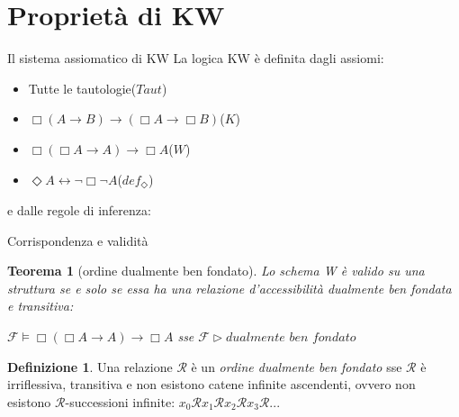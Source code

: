 \documentclass{beamer}
\begin{document}
\section{Proprietà di KW}
\begin{frame}{Il sistema assiomatico di KW}
La logica KW è definita dagli assiomi:
\begin{exampleblock}{}
    \begin{itemize}
        \item Tutte le tautologie\qquad\qquad\qquad\qquad\qquad\qquad ($Taut$)
        \item $\Box(A \to B) \to (\Box A \to \Box B)$\qquad\qquad\qquad\qquad\quad ($K$)
        \item $\Box (\Box A \to A) \to \Box A$\qquad\qquad\qquad\qquad\qquad\qquad ($W$)
        \item $\Diamond A \leftrightarrow \neg\Box\neg A$\qquad\qquad\qquad\qquad\qquad\qquad\qquad ($def_\Diamond$)
    \end{itemize}
\end{exampleblock}

e dalle regole di inferenza:
\begin{exampleblock}{}
        \begin{prooftree}
    \end{prooftree}
    \begin{prooftree}
    \end{prooftree}
\end{exampleblock}

\end{frame}




\begin{frame}{Corrispondenza e validità}
\newtheorem{teorema}{Teorema}
\begin{teorema}[ordine dualmente ben fondato]
Lo schema W è valido su una struttura se e solo se essa ha una relazione d’accessibilità dualmente ben fondata e transitiva:
\begin{center}
    $\mathcal{F} \models \Box(\Box A \to A) \to \Box A$ \textit{sse} $\mathcal{F}\rhd \textit{dualmente ben fondato}$
\end{center}

\end{teorema}
\theoremstyle{definition}
\newtheorem{defn}{Definizione}
\begin{defn}
Una relazione $\mathcal{R}$ è un \textit{ordine dualmente ben fondato} sse $\mathcal{R}$ è irriflessiva, transitiva e non esistono catene infinite ascendenti, ovvero non esistono $\mathcal{R}$-successioni infinite: $x_{0}\mathcal{R}x_{1}\mathcal{R}x_{2}\mathcal{R}x_{3}\mathcal{R}$...
\end{defn}
\end{frame}
\end{document}

